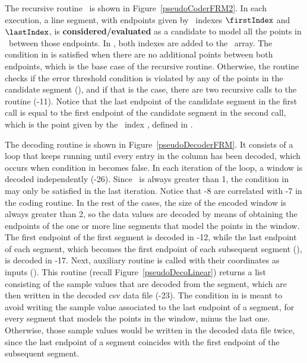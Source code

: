 The recursive routine \getDisplacedPointsMethod\ is shown in Figure~\ref{pseudoCoderFRM2}. In each execution, a line segment, with endpoints given by \window\ indexes $\firstIndex$ and $\lastIndex$, is \textbf{considered/evaluated} as a candidate to model all the points in \window\ between those endpoints. In , both indexes are added to the \disPoints\ array. The condition in  is satisfied when there are no additional points between both endpoints, which is the base case of the recursive routine. Otherwise, the routine checks if the error threshold condition is violated by any of the points in the candidate segment (), and if that is the case, there are two recursive calls to the routine (-11). Notice that the last endpoint of the candidate segment in the first call is equal to the first endpoint of the candidate segment in the second call, which is the point given by the \window\ index \half, defined in .




The decoding routine is shown in Figure~\ref{pseudoDecoderFRM}. It consists of a loop that keeps running until every entry in the column has been decoded, which occurs when condition in  becomes false. In each iteration of the loop, a window is decoded independently (-26). Since \win\ is always greater than 1, the condition in  may only be satisfied in the last iteration. Notice that -8 are correlated with -7 in the coding routine. In the rest of the cases, the size of the encoded window is always greater than 2, so the data values are decoded by means of obtaining the endpoints of the one or more line segments that model the points in the window. The first endpoint of the first segment is decoded in -12, while the last endpoint of each segment, which becomes the first endpoint of each subsequent segment (), is decoded in -17. Next, auxiliary routine \decodeSegment is called with their coordinates as inputs (). This routine (recall Figure~\ref{pseudoDecoLinear}) returns a list consisting of the sample values that are decoded from the segment, which are then written in the decoded csv data file (-23). The condition in  is meant to avoid writing the sample value associated to the last endpoint of a segment, for every segment that models the points in the window, minus the last one. Otherwise, those sample values would be written in the decoded data file twice, since the last endpoint of a segment coincides with the first endpoint of the subsequent segment.


